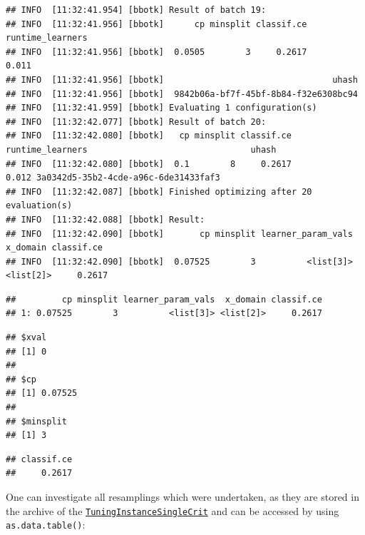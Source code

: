 \documentclass[
]{scrbook}
\newenvironment{Shaded}{\begin{snugshade}}{\end{snugshade}}
\newcommand{\NormalTok}[1]{#1}
\newcommand{\SpecialCharTok}[1]{\textcolor[rgb]{0.00,0.00,0.00}{#1}}
\renewenvironment{Shaded} {\begin{snugshade}\small} {\end{snugshade}}
\begin{document}
\begin{verbatim}
## INFO  [11:32:41.954] [bbotk] Result of batch 19: 
## INFO  [11:32:41.956] [bbotk]      cp minsplit classif.ce runtime_learners 
## INFO  [11:32:41.956] [bbotk]  0.0505        3     0.2617            0.011 
## INFO  [11:32:41.956] [bbotk]                                 uhash 
## INFO  [11:32:41.956] [bbotk]  9842b06a-bf7f-45bf-8b84-f32e6308bc94 
## INFO  [11:32:41.959] [bbotk] Evaluating 1 configuration(s) 
## INFO  [11:32:42.077] [bbotk] Result of batch 20: 
## INFO  [11:32:42.080] [bbotk]   cp minsplit classif.ce runtime_learners                                uhash 
## INFO  [11:32:42.080] [bbotk]  0.1        8     0.2617            0.012 3a0342d5-35b2-4cde-a96c-6de31433faf3 
## INFO  [11:32:42.087] [bbotk] Finished optimizing after 20 evaluation(s) 
## INFO  [11:32:42.088] [bbotk] Result: 
## INFO  [11:32:42.090] [bbotk]       cp minsplit learner_param_vals  x_domain classif.ce 
## INFO  [11:32:42.090] [bbotk]  0.07525        3          <list[3]> <list[2]>     0.2617
\end{verbatim}

\begin{verbatim}
##         cp minsplit learner_param_vals  x_domain classif.ce
## 1: 0.07525        3          <list[3]> <list[2]>     0.2617
\end{verbatim}

\begin{Shaded}
\end{Shaded}

\begin{verbatim}
## $xval
## [1] 0
## 
## $cp
## [1] 0.07525
## 
## $minsplit
## [1] 3
\end{verbatim}

\begin{Shaded}
\end{Shaded}

\begin{verbatim}
## classif.ce 
##     0.2617
\end{verbatim}

One can investigate all resamplings which were undertaken, as they are stored in the archive of the \href{https://mlr3tuning.mlr-org.com/reference/TuningInstanceSingleCrit.html}{\texttt{TuningInstanceSingleCrit}} and can be accessed by using \texttt{as.data.table()}:
\end{document}
